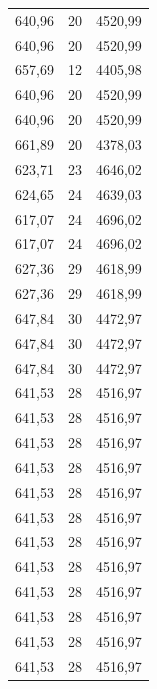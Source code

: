 \begin{center}
\begin{longtable}{|l|l|l|}
640,96            & 20               & 4520,99        \\
640,96            & 20               & 4520,99        \\
657,69            & 12               & 4405,98        \\
640,96            & 20               & 4520,99        \\
640,96            & 20               & 4520,99        \\
661,89            & 20               & 4378,03        \\
623,71            & 23               & 4646,02        \\
624,65            & 24               & 4639,03        \\
617,07            & 24               & 4696,02        \\
617,07            & 24               & 4696,02        \\
627,36            & 29               & 4618,99        \\
627,36            & 29               & 4618,99        \\
647,84            & 30               & 4472,97        \\
647,84            & 30               & 4472,97        \\
647,84            & 30               & 4472,97        \\
641,53            & 28               & 4516,97        \\
641,53            & 28               & 4516,97        \\
641,53            & 28               & 4516,97        \\
641,53            & 28               & 4516,97        \\
641,53            & 28               & 4516,97        \\
641,53            & 28               & 4516,97        \\
641,53            & 28               & 4516,97        \\
641,53            & 28               & 4516,97        \\
641,53            & 28               & 4516,97        \\
641,53            & 28               & 4516,97        \\
641,53            & 28               & 4516,97        \\
641,53            & 28               & 4516,97        \\

\end{longtable}
\end{center}
